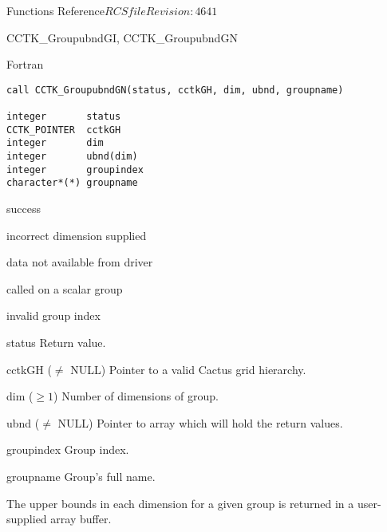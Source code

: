 \begin{cactuspart}{ Functions Reference}{$RCSfile$}{$Revision: 4641 $}
\begin{FunctionDescription}{CCTK\_GroupubndGI, CCTK\_GroupubndGN}
\begin{SynopsisSection}
\begin{Synopsis}{Fortran}
\begin{verbatim}
call CCTK_GroupubndGN(status, cctkGH, dim, ubnd, groupname)

integer       status
CCTK_POINTER  cctkGH
integer       dim
integer       ubnd(dim)
integer       groupindex
character*(*) groupname
\end{verbatim}
\end{Synopsis}
\end{SynopsisSection}

\begin{ResultSection}
\begin{Result}{0} success \end{Result}
\begin{Result}{-1} incorrect dimension supplied \end{Result}
\begin{Result}{-2} data not available from driver \end{Result}
\begin{Result}{-3} called on a scalar group \end{Result}
\begin{Result}{-4} invalid group index \end{Result}
\end{ResultSection}

\begin{ParameterSection}
\begin{Parameter}{status} Return value. \end{Parameter}
\begin{Parameter}{cctkGH ($\ne$ NULL)} Pointer to a valid Cactus grid hierarchy. \end{Parameter}
\begin{Parameter}{dim ($\ge 1$)} Number of dimensions of group. \end{Parameter}
\begin{Parameter}{ubnd ($\ne$ NULL)} Pointer to array which will hold the return values. \end{Parameter}
\begin{Parameter}{groupindex} Group index. \end{Parameter}
\begin{Parameter}{groupname} Group's full name. \end{Parameter}
\end{ParameterSection}

\begin{Discussion}
The upper bounds in each dimension for a given group is returned in a user-supplied array buffer.
\end{Discussion}


\end{FunctionDescription}
\end{cactuspart}
